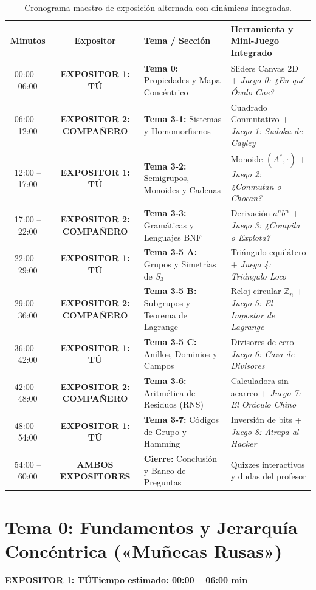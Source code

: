 \documentclass[11pt,a4paper]{article}
\newcommand{\badgeTu}{\colorbox{exp1bg}{\textcolor{exp1fg}{\bfseries\sffamily\footnotesize EXPOSITOR 1: TÚ}}}
\newcommand{\badgeComp}{\colorbox{exp2bg}{\textcolor{exp2fg}{\bfseries\sffamily\footnotesize EXPOSITOR 2: COMPAÑERO}}}
\newcommand{\badgeAmbos}{\colorbox{green!20}{\textcolor{green!60!black}{\bfseries\sffamily\footnotesize AMBOS EXPOSITORES}}}
\begin{document}
\begin{table}[h!]
\centering
\small
\renewcommand{\arraystretch}{1.25}
\begin{tabularx}{\textwidth}{c c X X}
\toprule
\textbf{Minutos} & \textbf{Expositor} & \textbf{Tema / Sección} & \textbf{Herramienta y Mini-Juego Integrado} \\
\midrule
00:00 -- 06:00 & \badgeTu & \textbf{Tema 0:} Propiedades y Mapa Concéntrico & Sliders Canvas 2D + \textit{Juego 0: ¿En qué Óvalo Cae?} \\
06:00 -- 12:00 & \badgeComp & \textbf{Tema 3-1:} Sistemas y Homomorfismos & Cuadrado Conmutativo + \textit{Juego 1: Sudoku de Cayley} \\
12:00 -- 17:00 & \badgeTu & \textbf{Tema 3-2:} Semigrupos, Monoides y Cadenas & Monoide $(A^*, \cdot)$ + \textit{Juego 2: ¿Conmutan o Chocan?} \\
17:00 -- 22:00 & \badgeComp & \textbf{Tema 3-3:} Gramáticas y Lenguajes BNF & Derivación $a^n b^n$ + \textit{Juego 3: ¿Compila o Explota?} \\
22:00 -- 29:00 & \badgeTu & \textbf{Tema 3-5 A:} Grupos y Simetrías de $S_3$ & Triángulo equilátero + \textit{Juego 4: Triángulo Loco} \\
29:00 -- 36:00 & \badgeComp & \textbf{Tema 3-5 B:} Subgrupos y Teorema de Lagrange & Reloj circular $\mathbb{Z}_n$ + \textit{Juego 5: El Impostor de Lagrange} \\
36:00 -- 42:00 & \badgeTu & \textbf{Tema 3-5 C:} Anillos, Dominios y Campos & Divisores de cero + \textit{Juego 6: Caza de Divisores} \\
42:00 -- 48:00 & \badgeComp & \textbf{Tema 3-6:} Aritmética de Residuos (RNS) & Calculadora sin acarreo + \textit{Juego 7: El Oráculo Chino} \\
48:00 -- 54:00 & \badgeTu & \textbf{Tema 3-7:} Códigos de Grupo y Hamming & Inversión de bits + \textit{Juego 8: Atrapa al Hacker} \\
54:00 -- 60:00 & \badgeAmbos & \textbf{Cierre:} Conclusión y Banco de Preguntas & Quizzes interactivos y dudas del profesor \\
\bottomrule
\end{tabularx}
\caption{Cronograma maestro de exposición alternada con dinámicas integradas.}
\end{table}

\newpage

\section{Tema 0: Fundamentos y Jerarquía Concéntrica («Muñecas Rusas»)}
\noindent\badgeTu \hfill \textbf{Tiempo estimado: 00:00 -- 06:00 min}
\end{document}
